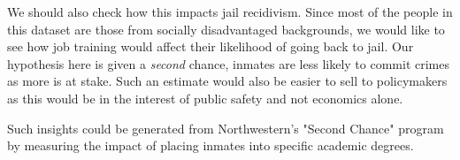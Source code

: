 \documentclass[12pt]{article}
\begin{document}
We should also check how this impacts jail recidivism. Since most of the people in this dataset are those from socially disadvantaged backgrounds, we would like to see how job training would affect their likelihood of going back to jail. Our hypothesis here is given a \textit{second} chance, inmates are less likely to commit crimes as more is at stake. Such an estimate would also be easier to sell to policymakers as this would be in the interest of public safety and not economics alone. 

Such insights could be generated from Northwestern's "Second Chance" program by measuring the impact of placing inmates into specific academic degrees.
\end{document}
